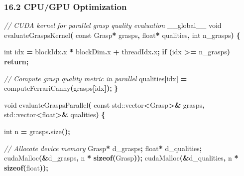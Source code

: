 \documentclass[
]{article}
\newenvironment{Shaded}{\begin{snugshade}}{\end{snugshade}}
\newcommand{\AttributeTok}[1]{\textcolor[rgb]{0.13,0.29,0.53}{#1}}
\newcommand{\BuiltInTok}[1]{#1}
\newcommand{\CommentTok}[1]{\textcolor[rgb]{0.56,0.35,0.01}{\textit{#1}}}
\newcommand{\ControlFlowTok}[1]{\textcolor[rgb]{0.13,0.29,0.53}{\textbf{#1}}}
\newcommand{\DataTypeTok}[1]{\textcolor[rgb]{0.13,0.29,0.53}{#1}}
\newcommand{\KeywordTok}[1]{\textcolor[rgb]{0.13,0.29,0.53}{\textbf{#1}}}
\newcommand{\NormalTok}[1]{#1}
\newcommand{\OperatorTok}[1]{\textcolor[rgb]{0.81,0.36,0.00}{\textbf{#1}}}
\begin{document}
\hypertarget{cpugpu-optimization}{%
\subsubsection{16.2 CPU/GPU Optimization}\label{cpugpu-optimization}}

\begin{Shaded}
\begin{Highlighting}[]
\CommentTok{// CUDA kernel for parallel grasp quality evaluation}
\NormalTok{\_\_global\_\_ }\DataTypeTok{void}\NormalTok{ evaluateGraspsKernel}\OperatorTok{(}
    \AttributeTok{const}\NormalTok{ Grasp}\OperatorTok{*}\NormalTok{ grasps}\OperatorTok{,} \DataTypeTok{float}\OperatorTok{*}\NormalTok{ qualities}\OperatorTok{,} \DataTypeTok{int}\NormalTok{ n\_grasps}\OperatorTok{)} \OperatorTok{\{}

    \DataTypeTok{int}\NormalTok{ idx }\OperatorTok{=}\NormalTok{ blockIdx}\OperatorTok{.}\NormalTok{x }\OperatorTok{*}\NormalTok{ blockDim}\OperatorTok{.}\NormalTok{x }\OperatorTok{+}\NormalTok{ threadIdx}\OperatorTok{.}\NormalTok{x}\OperatorTok{;}
    \ControlFlowTok{if} \OperatorTok{(}\NormalTok{idx }\OperatorTok{\textgreater{}=}\NormalTok{ n\_grasps}\OperatorTok{)} \ControlFlowTok{return}\OperatorTok{;}

    \CommentTok{// Compute grasp quality metric in parallel}
\NormalTok{    qualities}\OperatorTok{[}\NormalTok{idx}\OperatorTok{]} \OperatorTok{=}\NormalTok{ computeFerrariCanny}\OperatorTok{(}\NormalTok{grasps}\OperatorTok{[}\NormalTok{idx}\OperatorTok{]);}
\OperatorTok{\}}

\DataTypeTok{void}\NormalTok{ evaluateGraspsParallel}\OperatorTok{(}
    \AttributeTok{const} \BuiltInTok{std::}\NormalTok{vector}\OperatorTok{\textless{}}\NormalTok{Grasp}\OperatorTok{\textgreater{}\&}\NormalTok{ grasps}\OperatorTok{,} \BuiltInTok{std::}\NormalTok{vector}\OperatorTok{\textless{}}\DataTypeTok{float}\OperatorTok{\textgreater{}\&}\NormalTok{ qualities}\OperatorTok{)} \OperatorTok{\{}

    \DataTypeTok{int}\NormalTok{ n }\OperatorTok{=}\NormalTok{ grasps}\OperatorTok{.}\NormalTok{size}\OperatorTok{();}

    \CommentTok{// Allocate device memory}
\NormalTok{    Grasp}\OperatorTok{*}\NormalTok{ d\_grasps}\OperatorTok{;}
    \DataTypeTok{float}\OperatorTok{*}\NormalTok{ d\_qualities}\OperatorTok{;}
\NormalTok{    cudaMalloc}\OperatorTok{(\&}\NormalTok{d\_grasps}\OperatorTok{,}\NormalTok{ n }\OperatorTok{*} \KeywordTok{sizeof}\OperatorTok{(}\NormalTok{Grasp}\OperatorTok{));}
\NormalTok{    cudaMalloc}\OperatorTok{(\&}\NormalTok{d\_qualities}\OperatorTok{,}\NormalTok{ n }\OperatorTok{*} \KeywordTok{sizeof}\OperatorTok{(}\DataTypeTok{float}\OperatorTok{));}


\end{Highlighting}
\end{Shaded}
\end{document}
